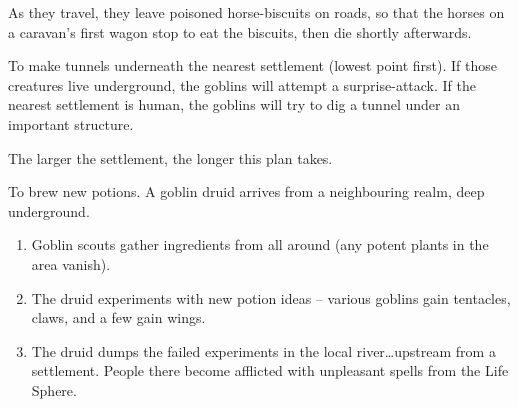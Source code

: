 \begin{multicols}{2}
\begin{dlist}
  As they travel, they leave poisoned horse-biscuits on roads, so that the horses on a caravan's first wagon stop to eat the biscuits, then die shortly afterwards.
  \item
  To make tunnels underneath the nearest settlement (lowest point first).
  If those creatures live underground, the goblins will attempt a surprise-attack.
  If the nearest settlement is human, the goblins will try to dig a tunnel under an important structure.

  The larger the settlement, the longer this plan takes.
  \item
  To brew new potions.
  A goblin druid arrives from a neighbouring realm, deep underground.
  \begin{enumerate}
    \item
    Goblin scouts gather \glspl{ingredient} from all around (any potent plants in the area vanish).
    \item
    The druid experiments with new potion ideas -- various goblins gain tentacles, claws, and a few gain wings.
    \item
    The druid dumps the failed experiments in the local river\ldots upstream from a settlement.
    People there become afflicted with unpleasant spells from the Life Sphere.
  \end{enumerate}
\end{dlist}

\end{multicols}

\section{}
\label{hag}

